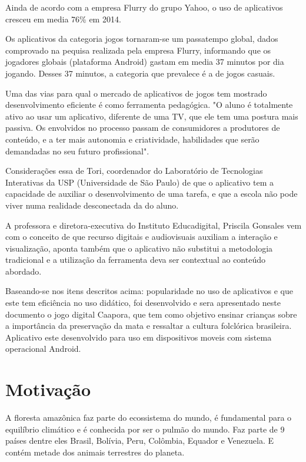 Ainda de acordo com a empresa Flurry do grupo Yahoo, o uso de aplicativos cresceu em media 76\% em 2014. \cite{prox}
	
	
Os aplicativos da categoria jogos tornaram-se um passatempo global, dados comprovado na pequisa  realizada pela empresa Flurry, informando que os jogadores globais (plataforma Android) gastam em media 37 minutos por dia jogando. Desses 37 minutos, a categoria que prevalece é a de jogos casuais. \cite{flur}

Uma das vias para qual o mercado de aplicativos de jogos tem mostrado desenvolvimento eficiente é como ferramenta pedagógica.
"O aluno é totalmente ativo ao usar um aplicativo, diferente de uma TV, que ele tem uma postura mais passiva. Os envolvidos no processo passam de consumidores a produtores de conteúdo, e a ter mais autonomia e criatividade, habilidades que serão demandadas no seu futuro profissional".

Considerações essa de Tori, coordenador do Laboratório de Tecnologias Interativas da USP (Universidade de São Paulo) de que o aplicativo tem a capacidade de auxiliar o desenvolvimento de uma tarefa, e que a escola não pode viver numa realidade desconectada da do aluno.

A professora e diretora-executiva do Instituto Educadigital, Priscila Gonsales vem com o conceito de que recurso digitais e audiovisuais auxiliam a interação e visualização, aponta também que o aplicativo não substitui a metodologia tradicional e a utilização da ferramenta deva ser contextual ao conteúdo abordado. \cite{tori}

Baseando-se nos itens descritos acima: popularidade no uso de aplicativos e que este tem eficiência no uso didático, foi desenvolvido e sera apresentado neste documento o jogo digital Caapora, que tem como objetivo ensinar crianças sobre a importância da preservação da mata e ressaltar a cultura folclórica brasileira.
Aplicativo este desenvolvido para uso em  dispositivos moveis com sistema operacional Android.

\section{Motivação}
\label{cap:motivacao}

A floresta amazônica faz parte do ecossistema do mundo, é fundamental para o equilíbrio climático e é conhecida por ser o pulmão do mundo. Faz parte de 9 países dentre eles Brasil, Bolívia, Peru, Colômbia, Equador e Venezuela. E contém metade dos animais terrestres do planeta.

